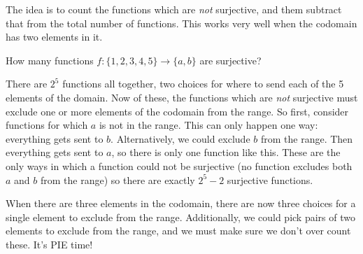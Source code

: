 \documentclass[12pt]{article}
\begin{document}
The idea is to count the functions which are {\em not} surjective, and them subtract that from the total number of functions.  This works very well when the codomain has two elements in it.

\begin{example}
  How many functions $f: \{1,2,3,4,5\} \to \{a,b\}$ are surjective?
  \begin{solution}
    There are $2^5$ functions all together, two choices for where to send each of the 5 elements of the domain.  Now of these, the functions which are {\em not} surjective must exclude one or more elements of the codomain from the range.  So first, consider functions for which $a$ is not in the range.  This can only happen one way: everything gets sent to $b$.  Alternatively, we could exclude $b$ from the range.  Then everything gets sent to $a$, so there is only one function like this.  These are the only ways in which a function could not be surjective (no function excludes both $a$ and $b$ from the range) so there are exactly $2^5 - 2$ surjective functions.
  \end{solution}
\end{example}

When there are three elements in the codomain, there are now three choices for a single element to exclude from the range.  Additionally, we could pick pairs of two elements to exclude from the range, and we must make sure we don't over count these.  It's PIE time!
\end{document}
